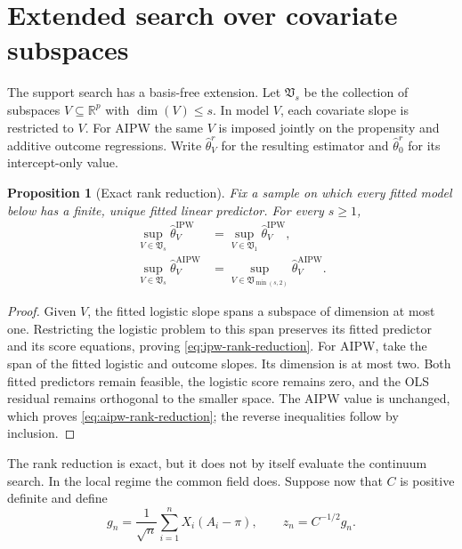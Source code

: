 \documentclass[a4paper,10pt,english]{article}
\newtheorem{proposition}{Proposition}[section]
\newcommand{\R}{\mathbb R}
\begin{document}
\section{Extended search over covariate subspaces}

The support search has a basis-free extension.  Let $\mathfrak V_s$ be the
collection of subspaces $V\subseteq\R^p$ with $\dim(V)\le s$.  In model
$V$, each covariate slope is restricted to $V$.  For AIPW the same $V$ is
imposed jointly on the propensity and additive outcome regressions.
Write $\hat\theta_V^r$ for the resulting estimator and
$\hat\theta_0^r$ for its intercept-only value.

\begin{proposition}[Exact rank reduction]
\label{prop:rank-reduction}
Fix a sample on which every fitted model below has a finite, unique fitted
linear predictor.  For every $s\ge1$,
\begin{align}
 \sup_{V\in\mathfrak V_s}\hat\theta_V^{\mathrm{IPW}}
 &=\sup_{V\in\mathfrak V_1}\hat\theta_V^{\mathrm{IPW}},
 \label{eq:ipw-rank-reduction}\\
 \sup_{V\in\mathfrak V_s}\hat\theta_V^{\mathrm{AIPW}}
 &=\sup_{V\in\mathfrak V_{\min(s,2)}}
   \hat\theta_V^{\mathrm{AIPW}}.
 \label{eq:aipw-rank-reduction}
\end{align}
\end{proposition}

\begin{proof}
Given $V$, the fitted logistic slope spans a subspace of dimension at most
one.  Restricting the logistic problem to this span preserves its fitted
predictor and its score equations, proving \eqref{eq:ipw-rank-reduction}.
For AIPW, take the span of the fitted logistic and outcome slopes.  Its
dimension is at most two.  Both fitted predictors remain feasible, the
logistic score remains zero, and the OLS residual remains orthogonal to the
smaller space.  The AIPW value is
unchanged, which proves \eqref{eq:aipw-rank-reduction}; the reverse
inequalities follow by inclusion.
\end{proof}

The rank reduction is exact, but it does not by itself evaluate the
continuum search.  In the local regime the common field does.  Suppose now
that $C$ is positive definite and define
\begin{equation}\label{eq:whitened-field}
 g_n=\frac1{\sqrt n}\sum_{i=1}^nX_i(A_i-\pi),
 \qquad
 z_n=C^{-1/2}g_n.
\end{equation}
\end{document}
